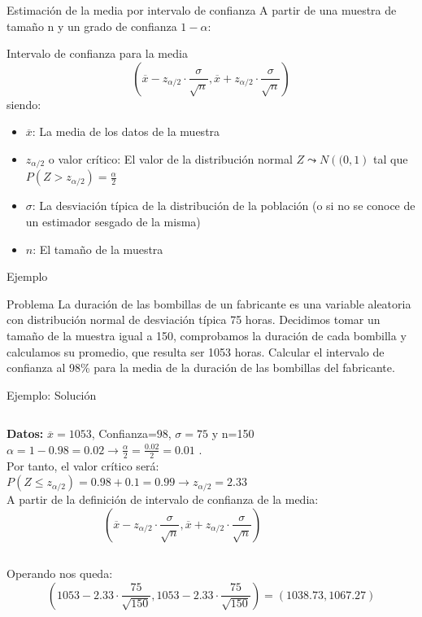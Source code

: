 \documentclass[11pt,handout]{beamer}
\begin{document}
\begin{frame}
{Estimación de la media por intervalo de confianza}
A partir de una muestra de tamaño n y un grado de confianza $1-\alpha$: 
\begin{block}{Intervalo de confianza para la media}
$$ \left( \overline{x} - z_{\alpha / 2}\cdot \frac{\sigma}{\sqrt{n}} ,  \overline{x} + z_{\alpha / 2}\cdot \frac{\sigma}{\sqrt{n}}
\right)$$
siendo: \begin{itemize}
\item $\overline{x}$: La media de los datos de la muestra
\item $z_{\alpha / 2}$ o valor crítico: El valor de la distribución normal  $Z\leadsto N\left((0,1\right)$ tal que $P(Z>z_{\alpha / 2})=\frac{\alpha}{2}$ 
\item $\sigma$: La desviación típica de la distribución de la población (o si no se conoce de un estimador sesgado de la misma)
\item $n$: El tamaño de la muestra
\end{itemize}
\end{block}
\pause

\end{frame}

\begin{frame}
{Ejemplo}
\begin{block}{Problema} La duración de las bombillas de un fabricante es una variable aleatoria con distribución
normal de desviación típica 75 horas. Decidimos tomar un tamaño de la muestra igual a 150, comprobamos la duración de cada
bombilla y calculamos su promedio, que resulta ser 1053 horas. Calcular el intervalo de confianza al 98\%
para la media de la duración de las bombillas del fabricante.
\end{block}
\end{frame}

\begin{frame}{Ejemplo: Solución}
\begin{columns}
\begin{column}{0.5\textwidth}
    \textbf{Datos:} $\overline{x}=1053$, Confianza=$98$, $\sigma=75$ y n=150 \\
    $\alpha=1-0.98=0.02 \to \frac{\alpha}{2}=\frac{0.02}{2}=0.01$
    . \\ Por tanto, el valor crítico será: \\
    $P\left(Z \leqslant z_{\alpha / 2} \right)= 0.98 + 0.1 = 0.99 \to z_{\alpha / 2} = 2.33$ \\
    A partir de la definición de intervalo de confianza de la media:
    $$ \left( \overline{x} - z_{\alpha / 2}\cdot \frac{\sigma}{\sqrt{n}} ,  \overline{x} + z_{\alpha / 2}\cdot \frac{\sigma}{\sqrt{n}}
    \right)$$

\end{column}
\begin{column}{0.5\textwidth}
    
\end{column}
\end{columns}
    
    Operando nos queda:
    $$ \left( 1053 - 2.33 \cdot \frac{75}{\sqrt{150}} ,  1053 - 2.33 \cdot \frac{75}{\sqrt{150}}
    \right)=\left(1038.73 ,  1067.27\right)
    $$
\end{frame}
\end{document}
